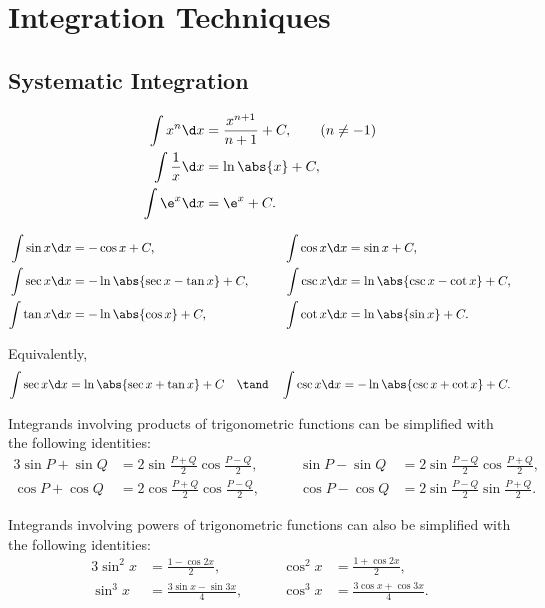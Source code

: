 \section{Integration Techniques}

\subsection{Systematic Integration}

\begin{proposition}
    \begin{align*}
        \int x^n \d x &= \frac{x^{n+1}}{n+1} + C, \tag{$n \neq -1$}\\
        \int \frac1x \d x &= \ln \abs{x} + C,\\
        \int \e^x \d x &= \e^x + C.
    \end{align*}
\end{proposition}

\begin{proposition}
    \begin{alignat*}{3}
        \int \sin x \d x &= -\cos x + C, \qquad & \int \cos x \d x &= \sin x + C,\\
        \int \sec x \d x &= -\ln \abs{\sec x - \tan x} + C, \qquad & \int \csc x \d x &= \ln \abs{\csc x - \cot x} + C,\\
        \int \tan x \d x &= -\ln \abs{\cos x} + C, \qquad & \int \cot x \d x &= \ln \abs{\sin x} + C.
    \end{alignat*}
\end{proposition}

Equivalently, \[\int \sec x \d x = \ln \abs{\sec x + \tan x} + C \quad \tand \quad \int \csc x \d x = -\ln \abs{\csc x + \cot x} + C.\]

Integrands involving products of trigonometric functions can be simplified with the following identities:
\begin{alignat*}{3}
    \sin P + \sin Q &= 2 \sin \frac{P + Q}{2} \cos \frac{P - Q}{2}, \qquad & \sin P - \sin Q &= 2 \sin \frac{P - Q}{2} \cos \frac{P + Q}{2},\\
    \cos P + \cos Q &= 2 \cos \frac{P + Q}{2} \cos \frac{P - Q}{2}, \qquad & \cos P - \cos Q &= 2 \sin \frac{P - Q}{2} \sin \frac{P + Q}{2}.
\end{alignat*}

Integrands involving powers of trigonometric functions can also be simplified with the following identities:
\begin{alignat*}{3}
    \sin^2 x &= \frac{1 - \cos 2x}{2}, \qquad & \cos^2 x &= \frac{1 + \cos 2x}{2},\\
    \sin^3 x &= \frac{3\sin x - \sin 3x}{4}, \qquad & \cos^3 x &= \frac{3\cos x + \cos 3x}{4}.
\end{alignat*}

